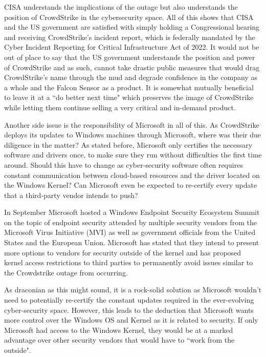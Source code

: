 CISA understands the implications of the outage but also understands the position of CrowdStrike in the cybersecurity space. All of this shows that CISA and the US government are satisfied with simply holding a Congressional hearing and receiving CrowdStrike's incident report, which is federally mandated by the Cyber Incident Reporting for Critical Infrastructure Act of 2022. It would not be out of place to say that the US government understands the position and power of CrowdStrike and as such, cannot take drastic public measures that would drag CrowdStrike's name through the mud and degrade confidence in the company as a whole and the Falcon Sensor as a product. It is somewhat mutually beneficial to leave it at a ``do better next time" which preserves the image of CrowdStrike while letting them continue selling a very critical and in-demand product.

Another side issue is the responsibility of Microsoft in all of this. As CrowdStrike deploys its updates to Windows machines through Microsoft, where was their due diligence in the matter? As stated before, Microsoft only certifies the necessary software and drivers once, to make sure they run without difficulties the first time around. Should this have to change as cyber-security software often requires constant communication between cloud-based resources and the driver located on the Windows Kernel? Can Microsoft even be expected to re-certify every update that a third-party vendor intends to push?

In September Microsoft hosted a Windows Endpoint Security Ecosystem Summit on the topic of endpoint security attended by multiple security vendors from the Microsoft Virus Initiative (MVI) as well as government officials from the United States and the European Union. Microsoft has stated that they intend to present more options to vendors for security outside of the kernel and has proposed kernel access restrictions to third parties to permanently avoid issues similar to the Crowdstrike outage from occurring.

As draconian as this might sound, it is a rock-solid solution as Microsoft wouldn't need to potentially re-certify the constant updates required in the ever-evolving cyber-security space. However, this leads to the deduction that Microsoft wants more control over the Windows OS and Kernel as it is related to security. If only Microsoft had access to the Windows Kernel, they would be at a marked advantage over other security vendors that would have to ``work from the outside".

